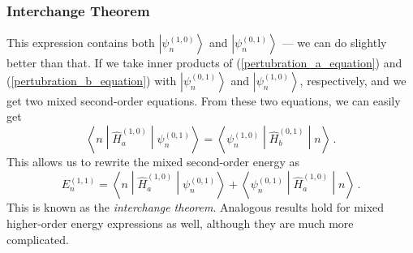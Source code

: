 \documentclass{article}
\theoremstyle{plain}\theoremheaderfont{\normalfont\itshape}\theorembodyfont{\rmfamily}\theoremseparator{.}\newtheorem*{rem}{Remark}\newtheorem*{ex}{Example}\newtheorem*{proof}{Proof}\newtheorem*{altp}{Alternative proof}
\theoremstyle{plain}\theoremheaderfont{\normalfont\bfseries}\theorembodyfont{\rmfamily}\theoremseparator{.}\newtheorem{thm}{Theorem}[section]\newtheorem{lem}[thm]{Lemma}\newtheorem{prop}[thm]{Proposition}\newtheorem*{cor}{Corollary}\newtheorem{defn}[thm]{Definition}\newtheorem{clm}[thm]{Claim}\newtheorem{clminproof}{Claim}
\theoremstyle{break}\theoremheaderfont{\normalfont\itshape}\theorembodyfont{\rmfamily}\theoremseparator{.\medskip}\newtheorem*{proofskip}{Proof}\newtheorem*{exs}{Examples}\newtheorem*{rems}{Remarks}
\theoremstyle{break}\theoremheaderfont{\normalfont\bfseries}\theorembodyfont{\rmfamily}\theoremseparator{.\medskip}\newtheorem{lemskip}[thm]{Lemma}\newtheorem{defnskip}[thm]{Definition}\newtheorem{propskip}[thm]{Proposition}\newtheorem{thmskip}[thm]{Theorem}
\numberwithin{equation}{section}
\newcommand{\ket}[1]{\left| #1 \right\rangle}
\newcommand{\mel}[3]{\left\langle #1 \middle| #2 \middle| #3 \right\rangle}
\begin{document}
    \subsubsection{Interchange Theorem}
    This expression contains both \(\ket{\psi_n^{(1,0)}}\) and \(\ket{\psi_n^{(0,1)}}\) --- we can do slightly better than that. If we take inner products of (\ref{pertubration_a_equation}) and (\ref{pertubration_b_equation}) with \(\ket{\psi_n^{(0,1)}}\) and \(\ket{\psi_n^{(1,0)}}\), respectively, and we get two mixed second-order equations. From these two equations, we can easily get
    \begin{equation}
        \mel{n}{\hat{H}_a^{(1,0)}}{\psi_n^{(0,1)}}=\mel{\psi_n^{(1,0)}}{\hat{H}_b^{(0,1)}}{n}\,.
    \end{equation}
    This allows us to rewrite the mixed second-order energy as
    \begin{equation}
        E_n^{(1,1)}=\mel{n}{\hat{H}_a^{(1,0)}}{\psi_n^{(0,1)}}+\mel{\psi_n^{(0,1)}}{\hat{H}_a^{(1,0)}}{n}\,.
    \end{equation}
    This is known as the \textit{interchange theorem}. Analogous results hold for mixed higher-order energy expressions as well, although they are much more complicated.
\end{document}
